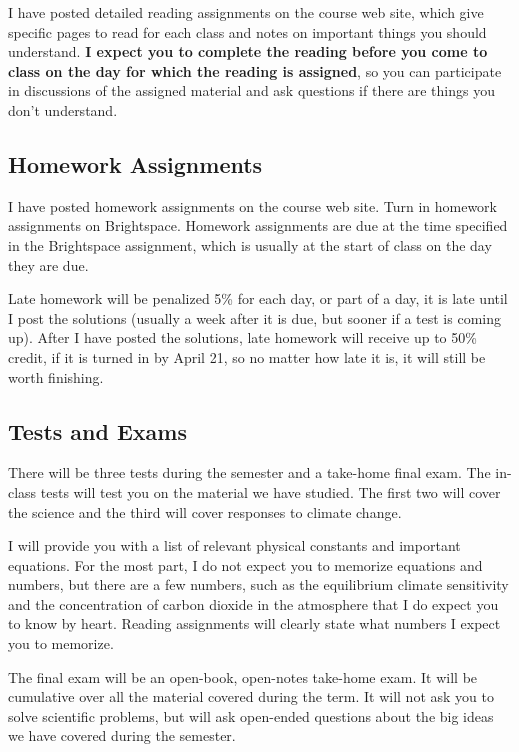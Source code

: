 \documentclass[11pt]{jgsyllabus}\usepackage[]{graphicx}\usepackage[]{xcolor}
\begin{document}
I have posted detailed reading assignments on the course web site, which give
specific pages to read for each class and notes on important things you should
understand.
\textbf{I expect you to complete the reading before you come to class on the day
for which the reading is assigned},
so you can participate in discussions of the
assigned material and ask questions if there are things you don't understand.

\subsection{Homework Assignments}

I have posted homework assignments on the course web site. Turn in homework
assignments on Brightspace. Homework assignments are due at the time specified
in the Brightspace assignment, which is usually at the start of class on the
day they are due.

Late homework will be penalized 5\% for each day, or part of a day, it is late
until I post the solutions (usually a week after it is due, but sooner if a
test is coming up).
After I have posted the solutions, late homework will receive up to 50\% credit,
if it is turned in by April 21, so no matter how late it is, it will still
be worth finishing.


\subsection{Tests and Exams}

There will be three tests during the semester and a take-home final exam.
The in-class tests will test you on the material we have studied. The first
two will cover the science and the third will cover responses to climate change.

I will provide you with a list of relevant physical constants and important
equations. For the most part, I do not expect you to memorize equations and
numbers, but there are a few numbers, such as the equilibrium climate
sensitivity and the concentration of carbon dioxide in the atmosphere that
I do expect you to know by heart. Reading assignments will clearly state what
numbers I expect you to memorize.

The final exam will be an open-book, open-notes take-home exam.
It will be cumulative over all the material covered during the term.
It will not ask you to solve scientific problems, but will
ask open-ended questions about the big ideas we have covered during the semester.
\end{document}
